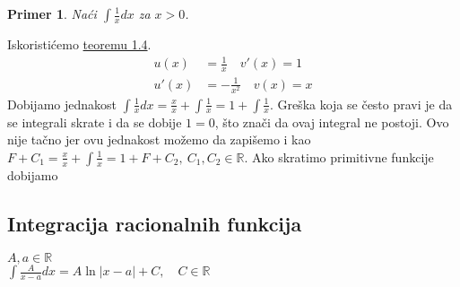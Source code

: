 \documentclass{article}
\newtheorem{prim}{Primer}[section]
\begin{document}
\begin{primbox}
    \begin{prim}
        Naći $\int \frac{1}{x} dx$ za $x > 0$.
    \end{prim}
    Iskoristićemo \hyperref[teorema_1.4]{teoremu 1.4}.
    \begin{align*}
        u(x)  & = \frac{1}{x}\quad v'(x)   = 1 \\
        u'(x) & = -\frac{1}{x^2}\quad v(x) = x
    \end{align*}
    Dobijamo jednakost $\int \frac{1}{x} dx = \frac{x}{x} + \int \frac{1}{x} = 1+ \int\frac{1}{x}$. Greška koja se
    često pravi je da se integrali skrate i da se dobije $1 = 0$, što znači da ovaj integral ne postoji.
    Ovo nije tačno jer ovu jednakost možemo da zapišemo i kao $F+C_1 = \frac{x}{x} + \int \frac{1}{x} = 1+F+C_2,\ C_1,C_2\in\mathbb{R}$.
    Ako skratimo primitivne funkcije dobijamo

\end{primbox}

\subsection{Integracija racionalnih funkcija}
\begin{primbox}
    $A, a \in \mathbb{R}$\\
    $\int \frac{A}{x-a}dx = A\ln|x-a| + C, \quad C \in \mathbb{R}$
\end{primbox}
\end{document}
